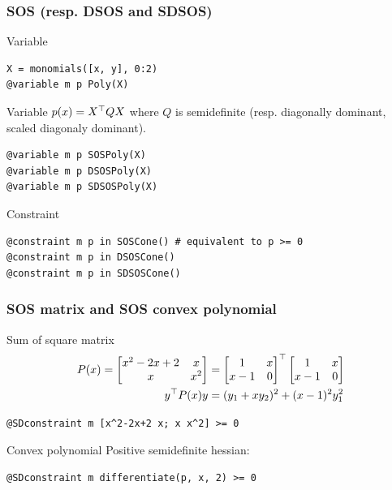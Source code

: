 \documentclass{beamer}
\begin{document}
  \begin{frame}[fragile]
    \frametitle{SOS (resp. DSOS and SDSOS)}
    \begin{block}{Variable}
      \vspace{-.5em}
\begin{verbatim}
X = monomials([x, y], 0:2)
@variable m p Poly(X)
\end{verbatim}
      \vspace{-.5em}
      Variable $p(x) = X^\top Q X$ where $Q$ is semidefinite (resp. diagonally dominant, scaled diagonaly dominant).
      \vspace{-.5em}
\begin{verbatim}
@variable m p SOSPoly(X)
@variable m p DSOSPoly(X)
@variable m p SDSOSPoly(X)
\end{verbatim}
    \end{block}
    \begin{block}{Constraint}
      \vspace{-.5em}
\begin{verbatim}
@constraint m p in SOSCone() # equivalent to p >= 0
@constraint m p in DSOSCone()
@constraint m p in SDSOSCone()
\end{verbatim}
    \end{block}
  \end{frame}
  \begin{frame}[fragile]
    \frametitle{SOS matrix and SOS convex polynomial}
    \begin{block}{Sum of square matrix}
      \begin{align*}
        P(x) = \begin{bmatrix}x^2 - 2x + 2 & x\\ x & x^2\end{bmatrix} & = \begin{bmatrix}1 & x\\x-1 & 0\end{bmatrix}^\top \begin{bmatrix}1 & x\\x-1 & 0\end{bmatrix}\\
        y^\top P(x) y & = (y_1 + xy_2)^2 + (x-1)^2y_1^2
      \end{align*}
\begin{verbatim}
@SDconstraint m [x^2-2x+2 x; x x^2] >= 0
\end{verbatim}
    \end{block}
    \begin{block}{Convex polynomial}
      Positive semidefinite hessian:
\begin{verbatim}
@SDconstraint m differentiate(p, x, 2) >= 0
\end{verbatim}
    \end{block}
  \end{frame}
\end{document}
